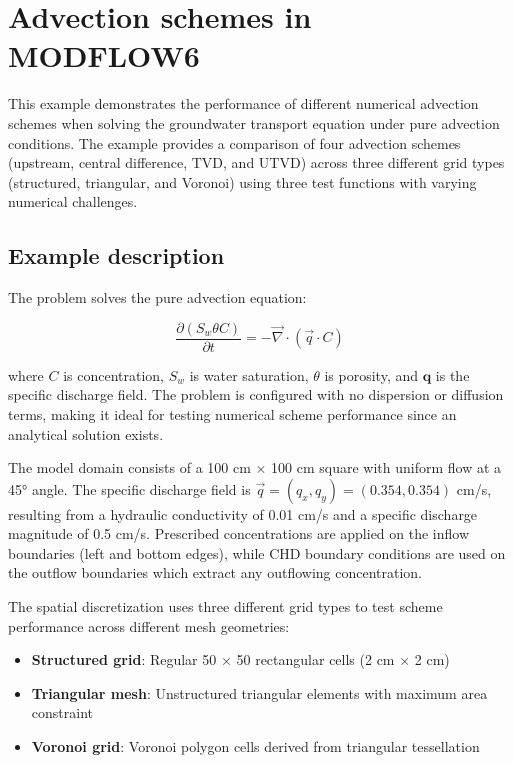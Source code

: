 \section{Advection schemes in MODFLOW6}

This example demonstrates the performance of different numerical advection schemes when solving the groundwater transport equation under pure advection conditions. The example provides a comparison of four advection schemes (upstream, central difference, TVD, and UTVD) across three different grid types (structured, triangular, and Voronoi) using three test functions with varying numerical challenges.

\subsection{Example description}

The problem solves the pure advection equation:

\begin{equation}
\frac{\partial \left(S_w \theta C\right)}{\partial t} = -\vec{\nabla} \cdot \left(\vec{q} \cdot C\right)
\label{eq:pureadvection}
\end{equation}

where $C$ is concentration, $S_w$ is water saturation, $\theta$ is porosity, and $\mathbf{q}$ is the specific discharge field. The problem is configured with no dispersion or diffusion terms, making it ideal for testing numerical scheme performance since an analytical solution exists.

The model domain consists of a 100 cm $\times$ 100 cm square with uniform flow at a 45° angle. The specific discharge field is $\vec{q} = (q_x, q_y) = (0.354, 0.354)$ cm/s, resulting from a hydraulic conductivity of 0.01 cm/s and a specific discharge magnitude of 0.5 cm/s. Prescribed concentrations are applied on the inflow boundaries (left and bottom edges), while CHD boundary conditions are used on the outflow boundaries which extract any outflowing concentration.

The spatial discretization uses three different grid types to test scheme performance across different mesh geometries:
\begin{itemize}
\item \textbf{Structured grid}: Regular 50 $\times$ 50 rectangular cells (2 cm $\times$ 2 cm)
\item \textbf{Triangular mesh}: Unstructured triangular elements with maximum area constraint
\item \textbf{Voronoi grid}: Voronoi polygon cells derived from triangular tessellation
\end{itemize}


